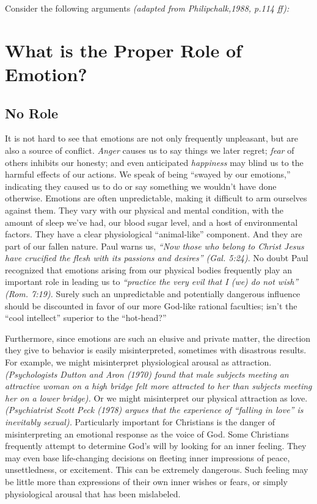 \documentclass[
]{book}
\begin{document}
Consider the following arguments \emph{(adapted from Philipchalk,1988, p.114 ff):}

\hypertarget{what-is-the-proper-role-of-emotion}{%
\section{What is the Proper Role of Emotion?}\label{what-is-the-proper-role-of-emotion}}

\hypertarget{no-role}{%
\subsection*{No Role}\label{no-role}}

It is not hard to see that emotions are not only frequently unpleasant, but are also a source of conflict. \emph{Anger} causes us to say things we later regret; \emph{fear} of others inhibits our honesty; and even anticipated \emph{happiness} may blind us to the harmful effects of our actions. We speak of being ``swayed by our emotions,'' indicating they caused us to do or say something we wouldn't have done otherwise. Emotions are often unpredictable, making it difficult to arm ourselves against them. They vary with our physical and mental condition, with the amount of sleep we've had, our blood sugar level, and a host of environmental factors. They have a clear physiological ``animal-like'' component. And they are part of our fallen nature. Paul warns us, \emph{``Now those who belong to Christ Jesus have crucified the flesh with its passions and desires'' (Gal. 5:24)}. No doubt Paul recognized that emotions arising from our physical bodies frequently play an important role in leading us to \emph{``practice the very evil that I (we) do not wish'' (Rom. 7:19).} Surely such an unpredictable and potentially dangerous influence should be discounted in favor of our more God-like rational faculties; isn't the ``cool intellect'' superior to the ``hot-head?''

Furthermore, since emotions are such an elusive and private matter, the direction they give to behavior is easily misinterpreted, sometimes with disastrous results. For example, we might misinterpret physiological arousal as attraction. \emph{(Psychologists Dutton and Aron (1970) found that male subjects meeting an attractive woman on a high bridge felt more attracted to her than subjects meeting her on a lower bridge).} Or we might misinterpret our physical attraction as love. \emph{(Psychiatrist Scott Peck (1978) argues that the experience of ``falling in love'' is inevitably sexual).} Particularly important for Christians is the danger of misinterpreting an emotional response as the voice of God. Some Christians frequently attempt to determine God's will by looking for an inner feeling. They may even base life-changing decisions on fleeting inner impressions of peace, unsettledness, or excitement. This can be extremely dangerous. Such feeling may be little more than expressions of their own inner wishes or fears, or simply physiological arousal that has been mislabeled.
\end{document}
